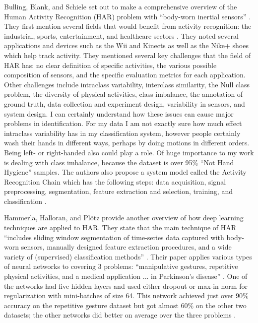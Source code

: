 \documentclass[]{report}
\begin{document}
Bulling, Blank, and Schiele set out to make a comprehensive overview of the Human Activity Recognition (HAR) problem with ``body-worn inertial sensors'' \cite{Bulling}. They first mention several fields that would benefit from activity recognition: the industrial, sports, entertainment, and healthcare sectors \cite{Bulling}. They noted several applications and devices such as the Wii and Kinects as well as the Nike+ shoes which help track activity. They mentioned several key challenges that the field of HAR has: no clear definition of specific activities, the various possible composition of sensors, and the specific evaluation metrics for each application. Other challenges include intraclass variability, interclass similarity, the Null class problem, the diversity of physical activities, class imbalance, the annotation of ground truth, data collection and experiment design, variability in sensors, and system design. I can certainly understand how these issues can cause major problems in identification. For my data I am not exactly sure how much effect intraclass variability has in my classification system, however people certainly wash their hands in different ways, perhaps by doing motions in different orders. Being left- or right-handed also could play a role. Of huge importance to my work is dealing with class imbalance, because the dataset is over 95\% ``Not Hand Hygiene'' samples. The authors also propose a system model called the Activity Recognition Chain which has the following steps: data acquisition, signal preprocessing, segmentation, feature extraction and selection, training, and classification \cite{Bulling}. 

Hammerla, Halloran, and Plötz provide another overview of how deep learning techniques are applied to HAR. They state that the main technique of HAR ``includes sliding window segmentation of time-series data captured with body-worn sensors, manually designed feature extraction procedures, and a wide variety of (supervised) classification methods'' \cite{Hammerla}. Their paper applies various types of neural networks to covering 3 problems: ``manipulative gestures, repetitive physical activities, and a medical application ... in Parkinson’s disease'' \cite{Hammerla}. One of the networks had five hidden layers and used either dropout or max-in norm for regularization with mini-batches of size 64. This network achieved just over 90\% accuracy on the repetitive gesture dataset but got almost 60\% on the other two datasets; the other networks did better on average over the three problems \cite{Hammerla}.
\end{document}
